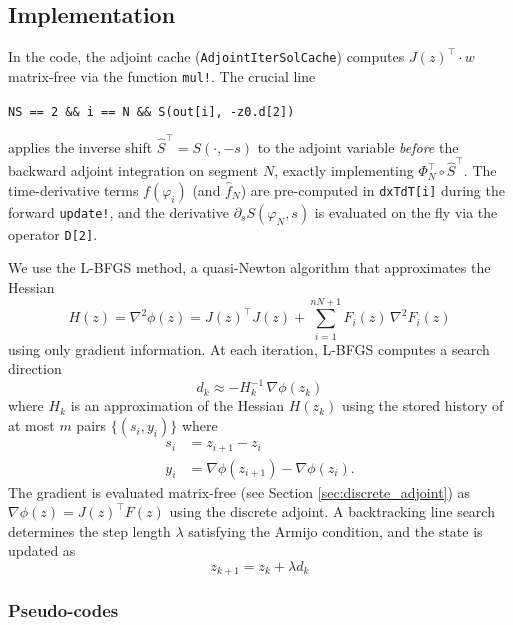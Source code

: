 \documentclass[11pt,a4paper]{article}
\begin{document}
\subsection{Implementation}

In the code, the adjoint cache (\texttt{AdjointIterSolCache}) computes
$J(z)^\top \cdot w$ matrix-free via the function \texttt{mul!}.
The crucial line
\begin{center}
\texttt{NS == 2 \&\& i == N \&\& S(out[i], -z0.d[2])}
\end{center}
applies the inverse shift $\widehat{S}^{\top} = S(\cdot, -s)$ to the adjoint
variable \emph{before} the backward adjoint integration on segment $N$,
exactly implementing $\Phi_N^{\top} \circ \widehat{S}^{\top}$.
The time-derivative terms $f(\varphi_i)$ (and $\widehat{f}_N$) are pre-computed
in \texttt{dxTdT[i]} during the forward \texttt{update!}, and the derivative
$\partial_s S(\varphi_N,s)$ is evaluated on the fly via the operator
\texttt{D[2]}.


We use the L-BFGS method, a quasi-Newton algorithm that approximates the Hessian
\begin{equation*}
    H(z)=\nabla^2\phi(z) = J(z)^\top J(z) + \sum_{i=1}^{nN+1} F_i(z)\,\nabla^2 F_i(z)
\end{equation*}
using only gradient information. At each iteration, L-BFGS computes a search direction 
\begin{equation*}
    d_k \approx -H_k^{-1}\,\nabla\phi(z_k)
\end{equation*}
where $H_k$ is an approximation of the Hessian $H(z_k)$ using the stored history of at most $m$ pairs $\{(s_i, y_i)\}$ where 
\begin{align*}
    s_i &= z_{i+1}-z_i\\
    y_i &= \nabla\phi(z_{i+1})-\nabla\phi(z_i).
\end{align*}
The gradient is evaluated matrix-free (see Section \ref{sec:discrete_adjoint}) as $\nabla\phi(z) = J(z)^\top F(z)$ using the discrete adjoint. 
A backtracking line search determines the step length $\lambda$ satisfying the Armijo condition, and the state is updated as
\begin{equation*}
    z_{k+1} = z_k + \lambda d_k
\end{equation*}

\subsubsection*{Pseudo-codes}
\end{document}
